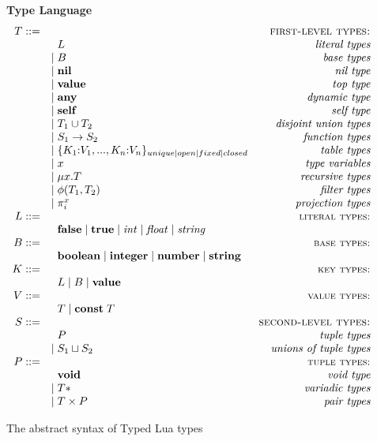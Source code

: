 \begin{figure}[!ht]
\textbf{Type Language}\\
\dstart
$$
\begin{array}{rlr}
T ::= & & \textsc{first-level types:}\\
& \;\; L & \textit{literal types}\\
& | \; B & \textit{base types}\\
& | \; \mathbf{nil} & \textit{nil type}\\
& | \; \mathbf{value} & \textit{top type}\\
& | \; \mathbf{any} & \textit{dynamic type}\\
& | \; \mathbf{self} & \textit{self type}\\
& | \; T_{1} \cup T_{2} & \textit{disjoint union types}\\
& | \; S_{1} \rightarrow S_{2} & \textit{function types}\\
& | \; \{K_{1}{:}V_{1}, ..., K_{n}{:}V_{n}\}_{unique|open|fixed|closed} & \textit{table types}\\
& | \; x & \textit{type variables}\\
& | \; \mu x.T & \textit{recursive types}\\
& | \; \phi(T_{1},T_{2}) & \textit{filter types}\\
& | \; \pi_{i}^{x} & \textit{projection types}\\
L ::= & & \textsc{{\small literal types:}}\\
& \;\; \mathbf{false} \; | \; \mathbf{true} \; | \; {\it int} \; | \; {\it float} \; | \; {\it string} &\\
B ::= & & \textsc{{\small base types:}}\\
& \;\; \mathbf{boolean} \; | \; \mathbf{integer} \; | \; \mathbf{number} \; | \; \mathbf{string} &\\
K ::= & & \textsc{{\small key types:}}\\
& \;\; L \; | \; B \; | \; \mathbf{value} &\\
V ::= & & \textsc{{\small value types:}}\\
& \;\; T \; | \; \mathbf{const} \; T &\\ 
S ::= & & \textsc{second-level types:}\\
& \;\; P & \textit{tuple types}\\
& | \; S_{1} \sqcup S_{2} & \textit{unions of tuple types}\\
P ::= & & \textsc{{\small tuple types:}}\\
& \;\; \mathbf{void} & \textit{void type}\\
& | \; T{*} & \textit{variadic types}\\
& | \; T \times P & \textit{pair types}
\end{array}
$$
\dend
\caption{The abstract syntax of Typed Lua types}
\label{fig:typelang}
\end{figure}

